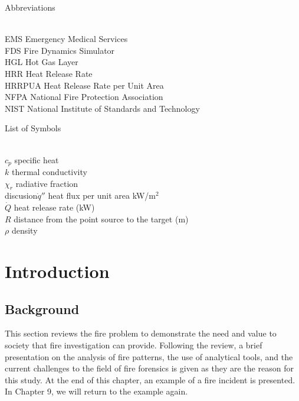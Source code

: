 \documentclass[twoside]{uocthesis}
\begin{document}
\clearpage
Abbreviations
\begin{tabbing}
\hspace{1.5in} \= \\
EMS \> Emergency Medical Services \\
FDS \> Fire Dynamics Simulator \\
HGL \> Hot Gas Layer \\
HRR \> Heat Release Rate \\
HRRPUA \> Heat Release Rate per Unit Area \\
NFPA \> National Fire Protection Association  \\
NIST \> National Institute of Standards and Technology \\
\end{tabbing}

List of Symbols
\begin{tabbing}
\hspace{1.5in} \= \\
$c_{p}$ \> specific heat \\
$k$ \> thermal conductivity \\
$\chi_r$ \> radiative fraction \\
discusion$\dot{q}''$ \> heat flux per unit area kW/m$^2$ \\
$\dot{Q}$ \> heat release rate (kW) \\ 
$R$ \> distance from the point source to the target (m) \\
$\rho$ \> density \\
\end{tabbing}

\textpages

\chapter{Introduction}
\label{chapter:Introduction}
\section{Background}

This section reviews the fire problem to demonstrate the need and value to society that fire investigation can provide. Following the review, a brief presentation on the analysis  of fire patterns, the use of analytical tools, and the current challenges to the field of fire forensics is given as they are the reason for this study.  At the end of this chapter, an example of a fire incident is presented. In Chapter 9, we will return to the example again.   
\end{document}
